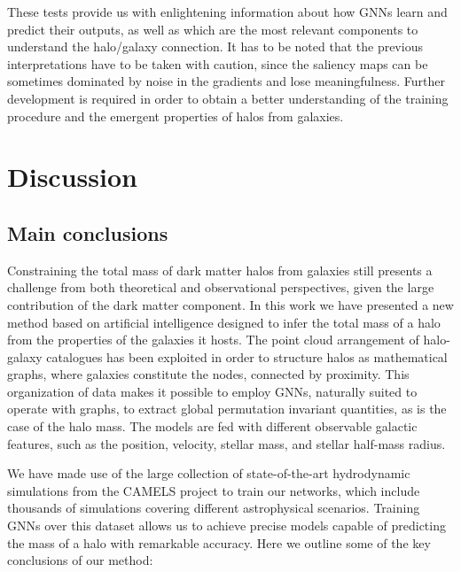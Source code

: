 \documentclass[twocolumn]{aastex631}
\begin{document}
These tests provide us with enlightening information about how GNNs learn and predict their outputs, as well as which are the most relevant components to understand the halo/galaxy connection. It has to be noted that the previous interpretations have to be taken with caution, since the saliency maps can be sometimes dominated by noise in the gradients and lose meaningfulness. Further development is required in order to obtain a better understanding of the training procedure and the emergent properties of halos from galaxies.






\section{Discussion}

\label{sec:discussion}

\subsection{Main conclusions}

Constraining the total mass of dark matter halos from galaxies still presents a challenge from both theoretical and observational perspectives, given the large contribution of the dark matter component. In this work we have presented a new method based on artificial intelligence designed to infer the total mass of a halo from the properties of the galaxies it hosts. The point cloud arrangement of halo-galaxy catalogues has been exploited in order to structure halos as mathematical graphs, where galaxies constitute the nodes, connected by proximity. This organization of data makes it possible to employ GNNs, naturally suited to operate with graphs, to extract global permutation invariant quantities, as is the case of the halo mass. The models are fed with different observable galactic features, such as the position, velocity, stellar mass, and stellar half-mass radius.

We have made use of the large collection of state-of-the-art hydrodynamic simulations from the CAMELS project to train our networks, which include thousands of simulations covering different astrophysical scenarios. Training GNNs over this dataset allows us to achieve precise models capable of predicting the mass of a halo with remarkable accuracy. Here we outline some of the key conclusions of our method:
\end{document}
